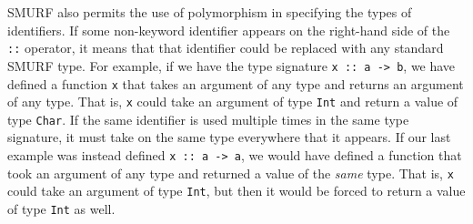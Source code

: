 SMURF also permits the use of polymorphism in specifying the types of identifiers. If some
non-keyword identifier appears on the right-hand side of the \texttt{::} operator, it means
that that identifier could be replaced with any standard SMURF type. For example, if we have
the type signature \texttt{x :: a -> b}, we have defined a function \texttt{x} that takes
an argument of any type and returns an argument of any type. That is, \texttt{x} could take
an argument of type \texttt{Int} and return a value of type \texttt{Char}.
If the same identifier is used multiple times in the same type signature, 
it must take on the same type everywhere that it appears. If our last example
was instead defined \texttt{x :: a -> a}, we would have defined a function that took an argument
of any type and returned a value of the \emph{same} type. That is, \texttt{x} could take an argument
of type \texttt{Int}, but then it would be forced to return a value of type \texttt{Int} as well.

